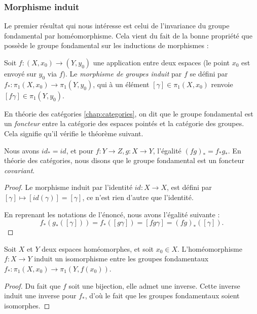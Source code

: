 \subsubsection{Morphisme induit}

Le premier résultat qui nous intéresse est celui de l'invariance du groupe fondamental par homéomorphisme. Cela vient du fait de la bonne propriété que possède le groupe fondamental sur les inductions de morphismes :

\begin{definition}
Soit $f:(X,x_0)\to(Y,y_0)$ une application entre deux espaces (le point $x_0$ est envoyé sur $y_0$ via $f$). Le \emph{morphisme de groupes induit} par $f$ se défini par $f_\ast:\pi_1(X,x_0)\to\pi_1(Y,y_0)$, qui à un élément $[\gamma]\in\pi_1(X,x_0)$ renvoie~$[f\gamma]\in\pi_1(Y,y_0)$. 
\end{definition}

En théorie des catégories \ref{chap:categories}, on dit que le groupe fondamental est un \emph{foncteur} entre la catégorie des espaces pointés et la catégorie des groupes. Cela signifie qu'il vérifie le théorème suivant.

\begin{theorem}
Nous avons $id_\ast=id$, et pour $f:Y\to Z, g:X\to Y$,  l'égalité $(fg)_\ast=f_\ast g_\ast$. En théorie des catégories, nous disons que le groupe fondamental est un foncteur \emph{covariant}.
\end{theorem}
\begin{proof}
Le morphisme induit par l'identité $id:X\to X$, est défini par $[\gamma]\mapsto[id(\gamma)]=[\gamma]$, ce n'est rien d'autre que l'identité.

En reprenant les notations de l'énoncé, nous avons l'égalité suivante : \[f_\ast(g_\ast([\gamma]))=f_\ast([g\gamma])=[fg\gamma]=(fg)_\ast([\gamma]).\]
\end{proof}



\begin{theorem}
Soit $X$ et $Y$ deux espaces homéomorphes, et soit $x_0\in X$. L'homéomorphisme~$f:X\to Y$ induit un isomorphisme entre les groupes fondamentaux $f_\ast:\pi_1(X,x_0)\to\pi_1(Y,f(x_0))$.
\end{theorem}
\begin{proof}
Du fait que $f$ soit une bijection, elle admet une inverse. Cette inverse induit une inverse pour $f_\ast$, d'où le fait que les groupes fondamentaux soient isomorphes.
\end{proof}

